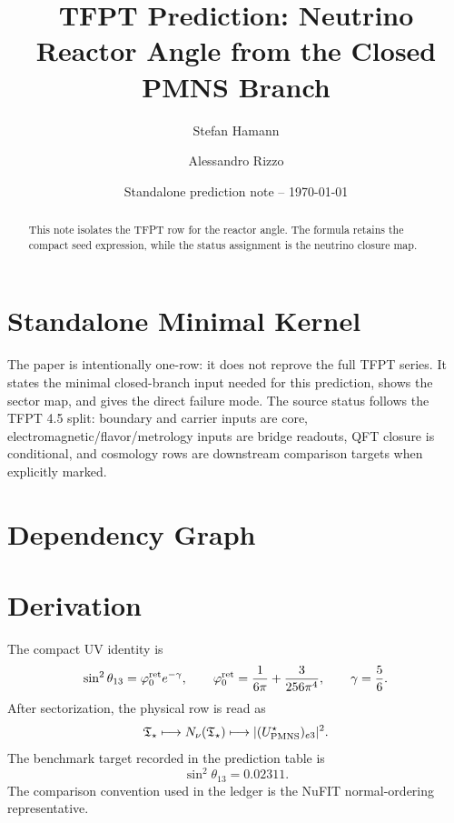 \documentclass[11pt,a4paper]{article}
\title{\color{tfptblue}\textbf{TFPT Prediction: Neutrino Reactor Angle from the Closed PMNS Branch}}
\author{Stefan Hamann \and Alessandro Rizzo}
\date{{\normalsize\color{tfptgray}\sffamily Standalone prediction note -- \today}}
\begin{document}
\maketitle

\begin{abstract}
This note isolates the TFPT row for the reactor angle. The formula retains the compact seed expression, while the status assignment is the neutrino closure map.
\end{abstract}



\section{Standalone Minimal Kernel}
\MinimalKernelBox

The paper is intentionally one-row: it does not reprove the full TFPT series. It states the minimal closed-branch input needed for this prediction, shows the sector map, and gives the direct failure mode. The source status follows the TFPT 4.5 split: boundary and carrier inputs are core, electromagnetic/flavor/metrology inputs are bridge readouts, QFT closure is conditional, and cosmology rows are downstream comparison targets when explicitly marked.


\section{Dependency Graph}

\section{Derivation}

The compact UV identity is
\[
\sin^2\theta_{13}=\varphi_0^{\mathrm{ret}} e^{-\gamma},
\qquad
\varphi_0^{\mathrm{ret}}=\frac{1}{6\pi}+\frac{3}{256\pi^4},
\qquad
\gamma=\frac56.
\]
After sectorization, the physical row is read as
\[
\mathfrak T_{\star}\longmapsto N_\nu(\mathfrak T_{\star})\longmapsto |(U_{\mathrm{PMNS}}^\star)_{e3}|^2.
\]
The benchmark target recorded in the prediction table is
\[
\sin^2\theta_{13}=0.02311.
\]
The comparison convention used in the ledger is the NuFIT normal-ordering representative.
\end{document}
